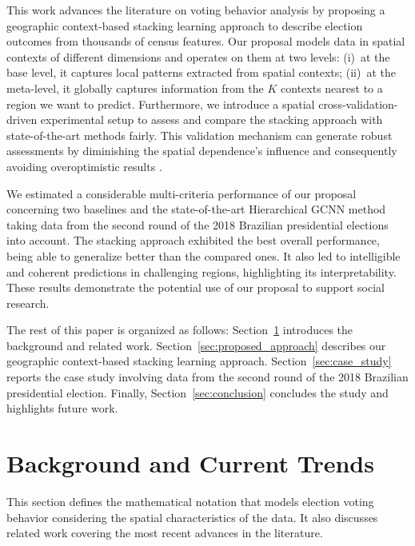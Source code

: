 \documentclass[runningheads]{llncs}
\begin{document}
This work advances the literature on voting behavior analysis by proposing a geographic context-based stacking learning approach to describe election outcomes from thousands of census features. Our proposal models data in spatial contexts of different dimensions and operates on them at two levels: (i)~at the base level, it captures local patterns extracted from spatial contexts; (ii)~at the meta-level, it globally captures information from the $K$ contexts nearest to a region we want to predict. %
Furthermore, we introduce a spatial cross-validation-driven experimental setup to assess and compare the stacking approach with state-of-the-art methods fairly. This validation mechanism can generate robust assessments by diminishing the spatial dependence's influence and consequently avoiding overoptimistic results \cite{tiago2021graph,ploton2020}.

We estimated a considerable multi-criteria performance of our proposal concerning two baselines and the state-of-the-art Hierarchical GCNN method taking data from the second round of the 2018 Brazilian presidential elections into account. The stacking approach exhibited the best overall performance, being able to generalize better than the compared ones. It also led to intelligible and coherent predictions in challenging regions, highlighting its interpretability. These results demonstrate the potential use of our proposal to support social research.

The rest of this paper is organized as follows: Section~\ref{sec:relatedwork} introduces the background and related work. Section~\ref{sec:proposed_approach} describes our geographic context-based stacking learning approach. Section~\ref{sec:case_study} reports the case study involving data from the second round of the 2018 Brazilian presidential election. Finally, Section~\ref{sec:conclusion} concludes the study and highlights future work.



\section{Background and Current Trends}
\label{sec:relatedwork}

This section defines the mathematical notation that models election voting behavior considering the spatial characteristics of the data. It also discusses related work covering the most recent advances in the literature.
\end{document}
